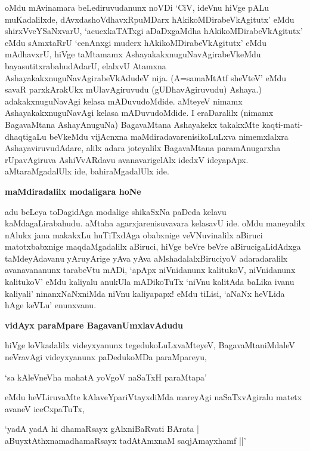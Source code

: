 \noindent
oMdu mAvinamara beLediruvudanunx noVDi `CiV, ideVnu hiVge pALu muKa\-dalilxde, dAvxdashoV\-dhavxR\-puMDarx hAkikoMDirabeVkAgitutx' eMdu shirxVveYSaNxvarU, `acucx\-kaTATxgi aDaDxgaMdha hAkikoMDira\-beVkA\-gitutx' eMdu sAmxtaRrU `cenAnxgi muderx hAki\-koMDirabeVkAgitutx' eMdu mAdhavxrU, hiVge taMtamamx Ashaya\-kakxnu\-guNa\-vAgira\-beVkeMdu bayasutitxrabahudAdarU, elalxvU Atamxna AshayakakxnuguNavAgirabeVkA\-dudeV nija. (A=samaMtAtf sheVteV' eMdu savaR parxkArakUkx mUlavAgiruvudu (gUDhavAgiruvudu) A\-shaya.) adakakxnuguNavAgi kelasa mADuvu\-doMdide. aMteyeV nimamx AshayakakxnuguNavAgi kelasa mADuvu\-doMdide. I eraDaralilx (nimamx BagavaMtana AshayAnuguNa) BagavaMtana Ashayakekx takakxMte kaqti-\-mati-\-dhaqtigaLu beVkeMdu vijAcnxna maMdiradavarenisikoLuLxva nimemxlalxra AshayaviruvudAdare, alilx adara jote\-yalilx BagavaMtana paramAnugarxha rUpavAgiruva AshiVvARdavu avanavarigelAlx idedxV ide\-yapApx. aMta\-raMgadalUlx ide, bahiraMgadalUlx ide. 

{\bigskip
\noindent
{\large\bf maMdiradalilx modaligara hoNe}}\label{page70}
\medskip

\noindent
adu beLeya toDagidAga modalige shikaSxNa paDeda kelavu kaMdagaLirabahudu. aMtaha agarxjarenisuva\-vara kelasavU ide. oMdu maneyalilx nAlukx jana makakxLu huTiTxdAga obabxnige veVNuvinalilx aBi\-ruci matotxbabx\-nige maqdaMgadalilx aBiruci, hiVge beVre beVre aBirucigaLidAdxga taMdeyAdavanu yAru\-yA\-rige yAva yAva aMshadalalxBiruciyoV adaradaralilx avanavananunx tarabeVtu mADi, `apApx niVnidanunx kalitukoV, niVnidanunx kalitukoV' eMdu kaliyalu anukUla mADikoTuTx `niVnu kalitAda baLika ivanu kaliyali' ninanxNaNxniMda niVnu kaliyapapx! eMdu tiLisi, `aNaNx heVLida hAge keVLu' enunxvanu.

{\bigskip
\noindent
{\large\bf vidAyx paraMpare BagavanUmxlavAdudu}}
\medskip

\noindent
hiVge loVkadalilx videyxyanunx tegedukoLuLxvaMteyeV, BagavaMtaniMdaleV neVravAgi videyxyanunx paDe\-du\-koMDa paraMpareyu,

\begin{shloka}
`sa kAleVneVha mahatA yoVgoV naSaTxH paraMtapa'\label{62}\label{70}
\end{shloka}

eMdu heVLiruvaMte kAlaveYpariVtayxdiMda mareyAgi naSaTxvAgiralu matetx avaneV iceCxpaTuTx,

\begin{shloka}
`yadA yadA hi dhamaRsayx gAlxniBaRvati BArata |\\\label{71}
aBuyxtAthxnamadhamaRsayx tadAtAmxnaM saqjAmayxhamf ||'
\end{shloka}

